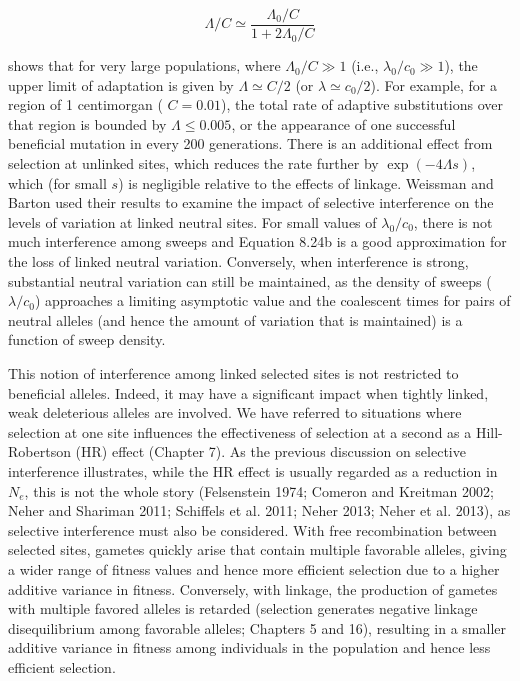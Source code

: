 \documentclass{article}
\begin{document}
\begin{equation}
\Lambda/C\simeq\frac{\Lambda_{0}/C}{1+2\Lambda_{0}/C}
\tag{8.27b}
\label{eq:8_27b}
\end{equation}

shows that for very large populations, where  $ \Lambda_0/C \gg 1 $ (i.e.,  $ \lambda_0/c_0 \gg 1 $), the upper limit of adaptation is given by  $ \Lambda \simeq C/2 $ (or  $ \lambda \simeq c_0/2 $). For example, for a region of 1 centimorgan ( $ C = 0.01 $), the total rate of adaptive substitutions over that region is bounded by  $ \Lambda \leq 0.005 $, or the appearance of one successful beneficial mutation in every 200 generations. There is an additional effect from selection at unlinked sites, which reduces the rate further by  $ \exp(-4\Lambda s) $, which (for small  $ s $) is negligible relative to the effects of linkage. Weissman and Barton used their results to examine the impact of selective interference on the levels of variation at linked neutral sites. For small values of  $ \lambda_0/c_0 $, there is not much interference among sweeps and Equation 8.24b is a good approximation for the loss of linked neutral variation. Conversely, when interference is strong, substantial neutral variation can still be maintained, as the density of sweeps ( $ \lambda/c_0 $) approaches a limiting asymptotic value and the coalescent times for pairs of neutral alleles (and hence the amount of variation that is maintained) is a function of sweep density.

This notion of interference among linked selected sites is not restricted to beneficial alleles. Indeed, it may have a significant impact when tightly linked, weak deleterious alleles are involved. We have referred to situations where selection at one site influences the effectiveness of selection at a second as a Hill-Robertson (HR) effect (Chapter 7). As the previous discussion on selective interference illustrates, while the HR effect is usually regarded as a reduction in  $ N_{e} $, this is not the whole story (Felsenstein 1974; Comeron and Kreitman 2002; Neher and Shariman 2011; Schiffels et al. 2011; Neher 2013; Neher et al. 2013), as selective interference must also be considered. With free recombination between selected sites, gametes quickly arise that contain multiple favorable alleles, giving a wider range of fitness values and hence more efficient selection due to a higher additive variance in fitness. Conversely, with linkage, the production of gametes with multiple favored alleles is retarded (selection generates negative linkage disequilibrium among favorable alleles; Chapters 5 and 16), resulting in a smaller additive variance in fitness among individuals in the population and hence less efficient selection.
\end{document}
